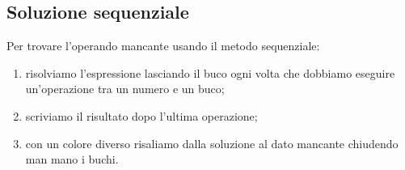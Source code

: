 
\subsection{Soluzione sequenziale}

\begin{procedura}
 Per trovare l'operando mancante usando il metodo sequenziale:
\begin{enumerate} [noitemsep]
 \item risolviamo l'espressione lasciando il buco ogni volta che 
  dobbiamo eseguire un'operazione tra un numero e un buco;
 \item scriviamo il risultato dopo l'ultima operazione;
 \item con un colore diverso risaliamo dalla soluzione al dato mancante
  chiudendo man mano i buchi.
\end{enumerate}
\end{procedura}


